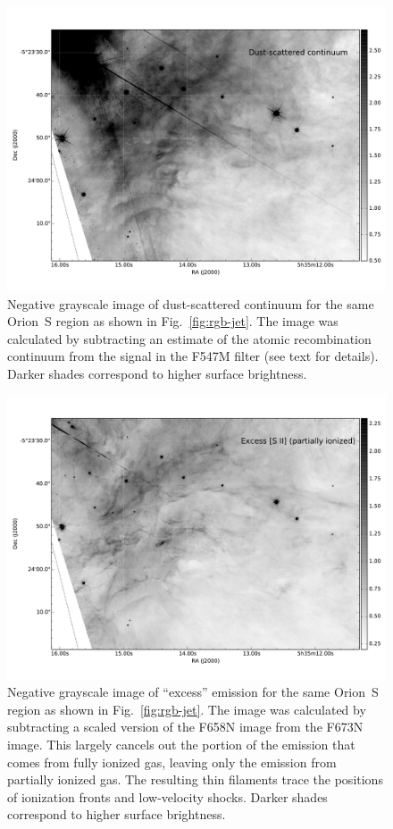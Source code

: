 \documentclass[preprint]{aastex}
\begin{document}
\begin{figure}
  \centering
  \includegraphics[width=\linewidth]{jet_region_scattered}
  \caption{Negative grayscale image of dust-scattered continuum for
    the same Orion~S region as shown in Fig.~\ref{fig:rgb-jet}.  The
    image was calculated by subtracting an estimate of the atomic
    recombination continuum from the signal in the F547M filter (see
    text for details).  Darker shades correspond to higher surface
    brightness.}
  \label{fig:scatter-jet}
\end{figure}

\begin{figure}
  \centering
  \includegraphics[width=\linewidth]{jet_region_excess-sii}
  \caption{Negative grayscale image of ``excess'' \sii{} emission for
    the same Orion~S region as shown in Fig.~\ref{fig:rgb-jet}.  The
    image was calculated by subtracting a scaled version of the F658N
    image from the F673N image.  This largely cancels out the portion
    of the \sii{} emission that comes from fully ionized gas, leaving
    only the emission from partially ionized gas.  The resulting thin
    filaments trace the positions of ionization fronts and
    low-velocity shocks.  Darker shades correspond to higher surface
    brightness.}
  \label{fig:sii-excess-jet}
\end{figure}
\end{document}
